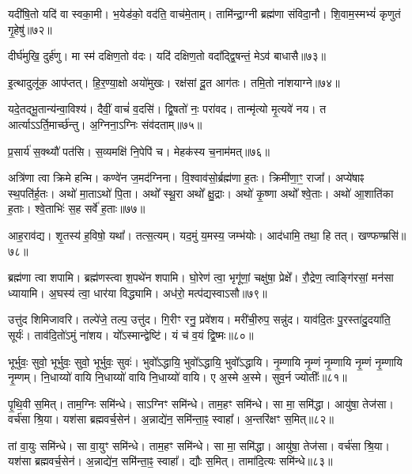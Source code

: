 यदी॑षि॒तो यदि॑ वा स्वका॒मी। 
भ॒येड॑को॒ वद॑ति॒ वाच॑मे॒ताम्। 
तामि॑न्द्रा॒ग्नी ब्रह्म॑णा संविदा॒नौ। 
शि॒वाम॒स्मभ्यं॑ कृणुतं गृ॒हेषु॑॥७२॥
\anuvakamend

दीर्घ॑मुखि॒ दुर्\mbox{}ह॑णु। 
मा स्म॑ दक्षिण॒तो व॑दः। 
यदि॑ दक्षिण॒तो वदा᳚द्द्वि॒षन्तं॒ मेऽव॑ बाधासै॥७३॥
\anuvakamend

इ॒त्थादुलू॑क॒ आप॑प्तत्। 
हि॒र॒ण्या॒क्षो अयो॑मुखः। 
रक्ष॑सां दू॒त आग॑तः। 
तमि॒तो ना॑शयाग्ने॥७४॥
\anuvakamend


यदे॒तद्भू॒तान्य॑न्वा॒विश्य॑। 
दैवीं॒ वाचं॑ व॒दसि॑। 
द्वि॒षतो॑ नः॒ परा॑वद। 
तान्मृ॑त्यो मृ॒त्यवे॑ नय। 
त आर्त्याऽऽर्ति॒मार्च्छ॑न्तु। 
अ॒ग्निना॒ऽग्निः संव॑दताम्॥७५॥
\anuvakamend


प्र॒सार्य॑ स॒क्थ्यौ॑ पत॑सि। 
स॒व्यमक्षि॑ नि॒पेपि॑ च। 
मेहक॑स्य च॒नाम॑मत्॥७६॥
\anuvakamend


अत्रि॑णा त्वा क्रिमे हन्मि। 
कण्वे॑न ज॒मद॑ग्निना। 
वि॒श्वाव॑सो॒र्ब्रह्म॑णा ह॒तः। 
क्रिमी॑णा॒ꣳ॒ राजा᳚। 
अप्ये॑षाꣴ स्थ॒पति॑र्\mbox{}ह॒तः। 
अथो॑ मा॒ताऽथो॑ पि॒ता। 
अथो᳚ स्थू॒रा अथो᳚ क्षु॒द्राः। 
अथो॑ कृ॒ष्णा अथो᳚ श्वे॒ताः। 
अथो॑ आ॒शाति॑का ह॒ताः। 
श्वे॒ताभिः॑ स॒ह सर्वे॑ ह॒ताः॥७७॥
\anuvakamend


आह॒राव॑द्य। 
शृ॒तस्य॑ ह॒विषो॒ यथा᳚। 
तत्स॒त्यम्। 
यद॒मुं य॒मस्य॒ जम्भ॑योः। 
आद॑धामि॒ तथा॒ हि तत्। 
खण्फण्म्रसि॑॥७८॥
\anuvakamend


ब्रह्म॑णा त्वा शपामि। 
ब्रह्म॑णस्त्वा श॒पथे॑न शपामि। 
घो॒रेण॑ त्वा॒ भृगू॑णां॒ चक्षु॑षा॒ प्रेक्षे᳚। 
रौ॒द्रेण॒ त्वाङ्गि॑रसां॒ मन॑सा ध्यायामि। 
अ॒घस्य॑ त्वा॒ धार॑या विद्ध्यामि। 
अध॑रो॒ मत्प॑द्यस्वाऽसौ॥७९॥%
\anuvakamend


उत्तु॑द शिमिजावरि। 
तल्पे॑जे॒ तल्प॒ उत्तु॑द। 
गि॒रीꣳ रनु॒ प्रवे॑शय। 
मरी॑ची॒रुप॒ सन्नु॑द। 
याव॑दि॒तः पु॒रस्ता॑दु॒दया॑ति॒ सूर्यः॑। 
ताव॑दि॒तो॑ऽमुं ना॑शय। 
यो᳚ऽस्मान्द्वेष्टि॑। 
यं च॑ व॒यं द्वि॒ष्मः॥८०॥
\anuvakamend


भूर्भुवः॒ सुवो॒ भूर्भुवः॒ सुवो॒ भूर्भुवः॒ सुवः॑। 
भुवो᳚ऽद्धायि॒ भुवो᳚ऽद्धायि॒ भुवो᳚ऽद्धायि। 
नृ॒म्णायि नृ॒म्णं नृ॒म्णायि नृ॒म्णं नृ॒म्णायि नृ॒म्णम्। 
नि॒धाय्यो॑ वायि नि॒धाय्यो॑ वायि नि॒धाय्यो॑ वायि। 
ए अ॒स्मे अ॒स्मे। 
सुव॒र्न ज्योतीः᳚॥८१॥
\anuvakamend


पृ॒थि॒वी स॒मित्। 
ताम॒ग्निः समि॑न्धे। 
साऽग्निꣳ समि॑न्धे। 
ताम॒हꣳ समि॑न्धे। 
सा मा॒ समि॑द्धा। 
आयु॑षा॒ तेज॑सा। 
वर्च॑सा श्रि॒या। 
यश॑सा ब्रह्मवर्च॒सेन॑। 
अ॒न्नाद्ये॑न॒ समि॑न्ता॒ꣴ॒ स्वाहा᳚। 
अ॒न्तरि॑क्षꣳ स॒मित्॥८२॥

तां वा॒युः समि॑न्धे। 
सा वा॒युꣳ समि॑न्धे। 
ताम॒हꣳ समि॑न्धे। 
सा मा॒ समि॑द्धा। 
आयु॑षा॒ तेज॑सा। 
वर्च॑सा श्रि॒या। 
यश॑सा ब्रह्मवर्च॒सेन॑। 
अ॒न्नाद्ये॑न॒ समि॑न्ता॒ꣴ॒ स्वाहा᳚। 
द्यौः स॒मित्। 
तामा॑दि॒त्यः समि॑न्धे॥८३॥

